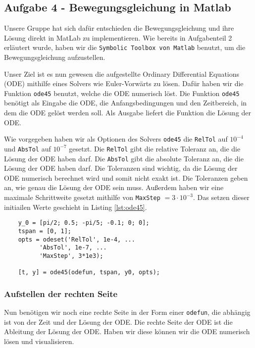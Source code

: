 \subsection*{Aufgabe 4 - Bewegungsgleichung in Matlab}

Unsere Gruppe hat sich dafür entschieden die Bewegungsgleichung und ihre Lösung direkt in MatLab zu implementieren. Wie bereits in Aufgabenteil 2 erläutert wurde, haben wir die \texttt{Symbolic Toolbox von Matlab} benutzt, um die Bewegungsgleichung aufzustellen.

Unser Ziel ist es nun gewesen die aufgestellte Ordinary Differential Equations (ODE) mithilfe eines Solvers wie Euler-Vorwärts zu lösen. Dafür haben wir die Funktion \texttt{ode45} benutzt, welche die ODE numerisch löst. Die Funktion \texttt{ode45} benötigt als Eingabe die ODE, die Anfangsbedingungen und den Zeitbereich, in dem die ODE gelöst werden soll. Als Ausgabe liefert die Funktion die Lösung der ODE.

Wie vorgegeben haben wir als Optionen des Solvers \texttt{ode45} die \texttt{RelTol} auf $10^{-4}$ und \texttt{AbsTol} auf $10^{-7}$ gesetzt. Die \texttt{RelTol} gibt die relative Toleranz an, die die Lösung der ODE haben darf. Die \texttt{AbsTol} gibt die absolute Toleranz an, die die Lösung der ODE haben darf. Die Toleranzen sind wichtig, da die Lösung der ODE numerisch berechnet wird und somit nicht exakt ist. Die Toleranzen geben an, wie genau die Lösung der ODE sein muss. Außerdem haben wir eine maximale Schrittweite gesetzt mithilfe von \texttt{MaxStep} $=3\cdot 10^{-3}$. Das setzen dieser initiailen Werte geschieht in Listing \ref{lst:ode45}.

\begin{lstlisting}[caption={Aufruf der Funktion \texttt{ode45}},label={lst:ode45}]
    % Syntax: y_0 = [alpha; alpha_dot; beta; beta_dot, err_alpha, err_beta]
    y_0 = [pi/2; 0.5; -pi/5; -0.1; 0; 0];
    tspan = [0, 1];
    opts = odeset('RelTol', 1e-4, ...
          'AbsTol', 1e-7, ...
          'MaxStep', 3*1e3);
    
    [t, y] = ode45(odefun, tspan, y0, opts);
\end{lstlisting}

\subsubsection*{Aufstellen der rechten Seite}

Nun benötigen wir noch eine rechte Seite in der Form einer \texttt{odefun}, die abhängig ist von der Zeit und der Lösung der ODE. Die rechte Seite der ODE ist die Ableitung der Lösung der ODE. Haben wir diese können wir die ODE numerisch lösen und visualisieren. 

